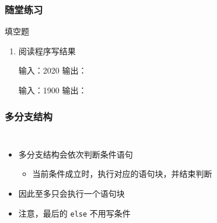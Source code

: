 \begin{frame}[fragile]
    \frametitle{随堂练习}

    \begin{exampleblock}{填空题}

        \begin{enumerate}
            \item 阅读程序写结果
                

                输入：2020 \tabto{8em} 输出：

                输入：1900 \tabto{8em} 输出：
        \end{enumerate}

    \end{exampleblock}
\end{frame}

\begin{frame}[fragile]
    \frametitle{多分支结构}

    \begin{columns}
        \begin{itemize}[<+->]
            \item 多分支结构会依次判断条件语句

                \begin{itemize}
                    \item 当前条件成立时，执行对应的语句块，并结束判断
                \end{itemize}

            \item 因此至多只会执行一个语句块

            \item 注意，最后的 \lstinline|else| 不用写条件
        \end{itemize}

        
    \end{columns}
\end{frame}

